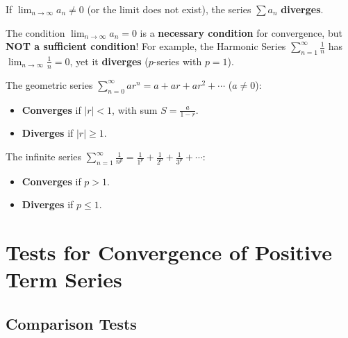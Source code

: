 \begin{theorem}
If $\lim_{n\to\infty} a_n \ne 0$ (or the limit does not exist), the series $\sum a_n$ \textbf{diverges}.
\end{theorem}

\begin{commonmistake}
The condition $\lim_{n\to\infty} a_n = 0$ is a \textbf{necessary condition} for convergence, but \textbf{NOT a sufficient condition}!
For example, the Harmonic Series $\sum_{n=1}^\infty \frac{1}{n}$ has $\lim_{n\to\infty} \frac{1}{n} = 0$, yet it \textbf{diverges} ($p$-series with $p=1$).
\end{commonmistake}

\begin{theorem}
The geometric series $\sum_{n=0}^\infty a r^n = a + ar + ar^2 + \cdots$ ($a \ne 0$):
\begin{itemize}[leftmargin=1.5em]
    \item \textbf{Converges} if $|r| < 1$, with sum $S = \frac{a}{1-r}$.
    \item \textbf{Diverges} if $|r| \ge 1$.
\end{itemize}
\end{theorem}

\begin{theorem}
The infinite series $\sum_{n=1}^\infty \frac{1}{n^p} = \frac{1}{1^p} + \frac{1}{2^p} + \frac{1}{3^p} + \cdots$:
\begin{itemize}[leftmargin=1.5em]
    \item \textbf{Converges} if $p > 1$.
    \item \textbf{Diverges} if $p \le 1$.
\end{itemize}
\end{theorem}

\section{Tests for Convergence of Positive Term Series}

\subsection{Comparison Tests}

